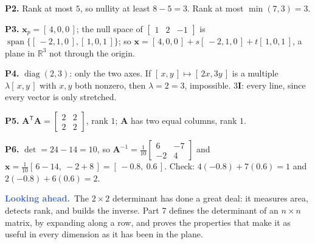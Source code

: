 \documentclass[11pt]{article}
\theoremstyle{plain}
\theoremstyle{definition}
\theoremstyle{remark}
\newcommand{\lookahead}{\par\smallskip\noindent
  \textbf{\sffamily\textcolor{RoyalBlue}{Looking ahead.}}\ \ignorespaces}
\newcommand{\R}{\mathbb{R}}
\newcommand{\vc}[1]{\mathbf{#1}}
\newcommand{\mt}[1]{\mathbf{#1}}
\newcommand{\T}{^{\mathsf{T}}}
\DeclareMathOperator{\spanop}{span}
\DeclareMathOperator{\diagop}{diag}
\begin{document}
\smallskip
\noindent\textbf{P2.} Rank at most $5$, so nullity at least $8-5=3$. Rank at most
$\min(7,3)=3$.

\smallskip
\noindent\textbf{P3.} $\vc{x}_p=[\,4,0,0\,]$; the null space of
$\begin{bmatrix}1&2&-1\end{bmatrix}$ is $\spanop\{[\,-2,1,0\,],[\,1,0,1\,]\}$; so
$\vc{x}=[\,4,0,0\,]+s[\,-2,1,0\,]+t[\,1,0,1\,]$, a plane in $\R^{3}$ not through
the origin.

\smallskip
\noindent\textbf{P4.} $\diagop(2,3)$: only the two axes. If $[\,x,y\,]\mapsto[\,2x,3y\,]$
is a multiple $\lambda[\,x,y\,]$ with $x,y$ both nonzero, then $\lambda=2=3$,
impossible. $3\mt{I}$: every line, since every vector is only stretched.

\smallskip
\noindent\textbf{P5.} $\mt{A}\T\mt{A}=\begin{bmatrix}2&2\\2&2\end{bmatrix}$, rank $1$;
$\mt{A}$ has two equal columns, rank $1$. \checkmark

\smallskip
\noindent\textbf{P6.} $\det=24-14=10$, so
$\mt{A}^{-1}=\frac{1}{10}\begin{bmatrix}6&-7\\-2&4\end{bmatrix}$ and
$\vc{x}=\frac{1}{10}[\,6-14,\ -2+8\,]=[\,-0.8,\ 0.6\,]$. Check:
$4(-0.8)+7(0.6)=1$ and $2(-0.8)+6(0.6)=2$. \checkmark

\lookahead The $2\times2$ determinant has done a great deal: it measures area,
detects rank, and builds the inverse. Part 7 defines the determinant of an
$n\times n$ matrix, by expanding along a row, and proves the properties that
make it as useful in every dimension as it has been in the plane.
\end{document}
